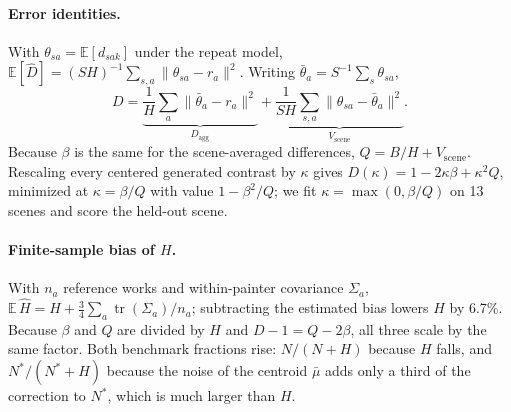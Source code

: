 \paragraph{Error identities.} With $\theta_{sa}=\mathbb E[d_{sak}]$ under the repeat model,
$\mathbb E[\widehat D]=(SH)^{-1}\sum_{s,a}\|\theta_{sa}-r_a\|^2$. Writing
$\bar\theta_a=S^{-1}\sum_s\theta_{sa}$,
\begin{equation}
D=\underbrace{\frac1H\sum_a\|\bar\theta_a-r_a\|^2}_{D_{\mathrm{agg}}}
+\underbrace{\frac{1}{SH}\sum_{s,a}\|\theta_{sa}-\bar\theta_a\|^2}_{V_{\mathrm{scene}}}.
\end{equation}
Because $\beta$ is the same for the scene-averaged differences, $Q=B/H+V_{\mathrm{scene}}$.
Rescaling every centered generated contrast by $\kappa$ gives $D(\kappa)=1-2\kappa\beta+\kappa^2Q$,
minimized at $\kappa=\beta/Q$ with value $1-\beta^2/Q$; we fit $\kappa=\max(0,\beta/Q)$ on 13
scenes and score the held-out scene.

\paragraph{Finite-sample bias of $H$.} With $n_a$ reference works and within-painter covariance
$\Sigma_a$, $\mathbb E\,\widehat H=H+\frac34\sum_a\operatorname{tr}(\Sigma_a)/n_a$; subtracting
the estimated bias lowers $H$ by 6.7\%. Because $\beta$ and $Q$ are divided by $H$ and
$D-1=Q-2\beta$, all three scale by the same factor. Both benchmark fractions rise: $N/(N+H)$
because $H$ falls, and $N^*/(N^*+H)$ because the noise of the centroid $\bar\mu$ adds only a third
of the correction to $N^*$, which is much larger than $H$.

